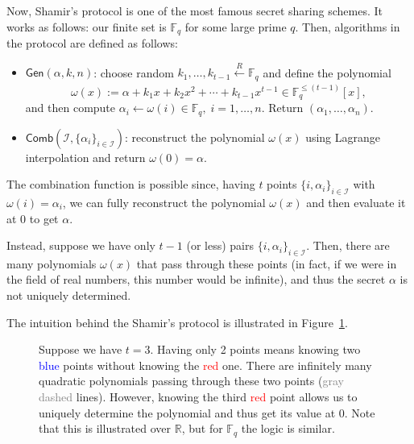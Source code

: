 \documentclass[../lecture-notes.tex]{subfiles}
\begin{document}
Now, Shamir's protocol is one of the most famous secret sharing schemes. It works as follows: our finite set is $\mathbb{F}_q$ for some large prime $q$. Then, algorithms in the protocol are defined as follows:
\begin{itemize}
    \item $\mathsf{Gen}(\alpha, k, n)$: choose random $k_1,\dots,k_{t-1} \xleftarrow[]{R} \mathbb{F}_q$ and define the polynomial
    \begin{equation*}
        \omega(x) := \alpha + k_1x + k_2x^2 + \cdots + k_{t-1}x^{t-1} \in \mathbb{F}_q^{\leq (t-1)}[x],     
    \end{equation*}
    and then compute $\alpha_i \gets \omega(i) \in \mathbb{F}_q, \; i = 1,\dots,n$. Return $(\alpha_1,\dots,\alpha_n)$.
    \item $\mathsf{Comb}(\mathcal{I}, \{\alpha_i\}_{i \in \mathcal{I}})$: reconstruct the polynomial $\omega(x)$ using Lagrange interpolation and return $\omega(0) = \alpha$.
\end{itemize}

The combination function is possible since, having $t$ points $\{i,\alpha_i\}_{i \in \mathcal{I}}$ with $\omega(i) = \alpha_i$, we can fully reconstruct the polynomial $\omega(x)$ and then evaluate it at $0$ to get $\alpha$.

Instead, suppose we have only $t-1$ (or less) pairs $\{i,\alpha_i\}_{i \in \mathcal{I}}$. Then, there are many polynomials $\omega(x)$ that pass through these points (in fact, if we were in the field of real numbers, this number would be infinite), and thus the secret $\alpha$ is not uniquely determined.

The intuition behind the Shamir's protocol is illustrated in Figure~\ref{fig:shamir}.

\begin{figure}[H]
    \centering
    \caption{Suppose we have $t=3$. Having only 2 points means knowing two \textcolor{blue}{blue} points without knowing the \textcolor{red}{red} one. There are infinitely many quadratic polynomials passing through these two points (\textcolor{gray}{gray dashed} lines). However, knowing the third \textcolor{red}{red} point allows us to uniquely determine the polynomial and thus get its value at $0$. Note that this is illustrated over $\mathbb{R}$, but for $\mathbb{F}_q$ the logic is similar.}
    \label{fig:shamir}
\end{figure}
\end{document}
